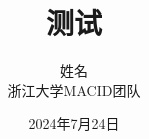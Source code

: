 \documentclass[aspectratio=169]{beamer}
\title{测试}
\date{2024年7月24日}
\author{姓名 \\{浙江大学MACID团队}}
\begin{document}
	
	\begin{frame}
		
    \titlepage
    \end{frame}
\end{document}
